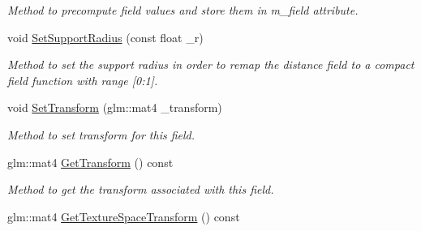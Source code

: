\begin{DoxyCompactItemize}
\begin{DoxyCompactList}\small\item\em Method to precompute field values and store them in m\+\_\+field attribute. \end{DoxyCompactList}\item 
void \hyperlink{classFieldFunction_ae15deaf7aa376b9855cf67997974ced0}{Set\+Support\+Radius} (const float \+\_\+r)\hypertarget{classFieldFunction_ae15deaf7aa376b9855cf67997974ced0}{}\label{classFieldFunction_ae15deaf7aa376b9855cf67997974ced0}

\begin{DoxyCompactList}\small\item\em Method to set the support radius in order to remap the distance field to a compact field function with range \mbox{[}0\+:1\mbox{]}. \end{DoxyCompactList}\item 
void \hyperlink{classFieldFunction_a78aea31d711f0dad495aa1ab9c842203}{Set\+Transform} (glm\+::mat4 \+\_\+transform)\hypertarget{classFieldFunction_a78aea31d711f0dad495aa1ab9c842203}{}\label{classFieldFunction_a78aea31d711f0dad495aa1ab9c842203}

\begin{DoxyCompactList}\small\item\em Method to set transform for this field. \end{DoxyCompactList}\item 
glm\+::mat4 \hyperlink{classFieldFunction_af0d5784f34000520636f74f5b5cb32e6}{Get\+Transform} () const \hypertarget{classFieldFunction_af0d5784f34000520636f74f5b5cb32e6}{}\label{classFieldFunction_af0d5784f34000520636f74f5b5cb32e6}

\begin{DoxyCompactList}\small\item\em Method to get the transform associated with this field. \end{DoxyCompactList}\item 
glm\+::mat4 \hyperlink{classFieldFunction_aa6aacd61b070c344d21f7f2d6915a125}{Get\+Texture\+Space\+Transform} () const \hypertarget{classFieldFunction_aa6aacd61b070c344d21f7f2d6915a125}{}\label{classFieldFunction_aa6aacd61b070c344d21f7f2d6915a125}


\end{DoxyCompactItemize}

